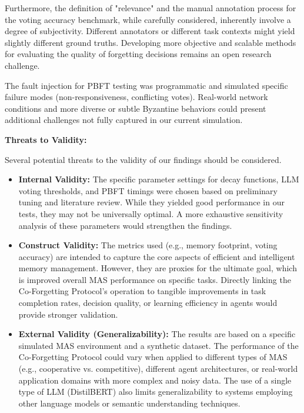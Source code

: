 \documentclass[conference]{IEEEtran}
\begin{document}
Furthermore, the definition of "relevance" and the manual annotation process for the voting accuracy benchmark, while carefully considered, inherently involve a degree of subjectivity. Different annotators or different task contexts might yield slightly different ground truths. Developing more objective and scalable methods for evaluating the quality of forgetting decisions remains an open research challenge.

The fault injection for PBFT testing was programmatic and simulated specific failure modes (non-responsiveness, conflicting votes). Real-world network conditions and more diverse or subtle Byzantine behaviors could present additional challenges not fully captured in our current simulation.

\textbf{Threats to Validity:}

Several potential threats to the validity of our findings should be considered.

\begin{itemize}
    \item \textbf{Internal Validity:} The specific parameter settings for decay functions, LLM voting thresholds, and PBFT timings were chosen based on preliminary tuning and literature review. While they yielded good performance in our tests, they may not be universally optimal. A more exhaustive sensitivity analysis of these parameters would strengthen the findings.
    \item \textbf{Construct Validity:} The metrics used (e.g., memory footprint, voting accuracy) are intended to capture the core aspects of efficient and intelligent memory management. However, they are proxies for the ultimate goal, which is improved overall MAS performance on specific tasks. Directly linking the Co-Forgetting Protocol’s operation to tangible improvements in task completion rates, decision quality, or learning efficiency in agents would provide stronger validation.
    \item \textbf{External Validity (Generalizability):} The results are based on a specific simulated MAS environment and a synthetic dataset. The performance of the Co-Forgetting Protocol could vary when applied to different types of MAS (e.g., cooperative vs. competitive), different agent architectures, or real-world application domains with more complex and noisy data. The use of a single type of LLM (DistilBERT) also limits generalizability to systems employing other language models or semantic understanding techniques.
\end{itemize}
\end{document}
